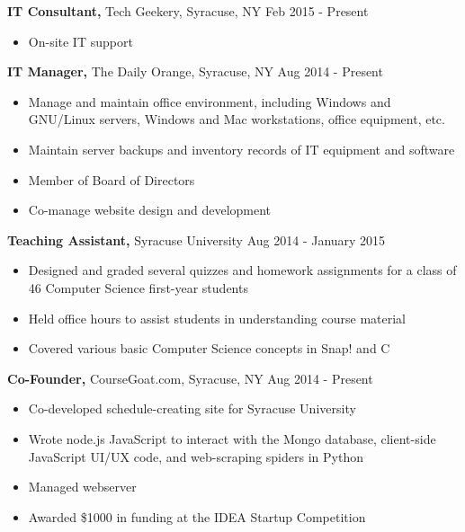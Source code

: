 \documentclass[margin]{res}
\begin{document}
\begin{resume}
 {\bf IT Consultant,} Tech Geekery, Syracuse, NY \hfill  Feb 2015 - Present
\begin{itemize} \itemsep -2pt %
\item On-site IT support
\end{itemize}
 
{\bf IT Manager,} The Daily Orange, Syracuse, NY \hfill  Aug 2014 - Present
\begin{itemize} \itemsep -2pt %
\item Manage and maintain office environment, including Windows and GNU/Linux servers, Windows and Mac workstations, office equipment, etc.
\item Maintain server backups and inventory records of IT equipment and software
\item Member of Board of Directors
\item Co-manage website design and development
\end{itemize}

{\bf Teaching Assistant,} Syracuse University \hfill  Aug 2014 - January 2015
\begin{itemize} \itemsep -2pt %
\item Designed and graded several quizzes and homework assignments for a class of 46 Computer Science first-year students
\item Held office hours to assist students in understanding course material
\item Covered various basic Computer Science concepts in Snap! and C
\end{itemize}

{\bf Co-Founder,} CourseGoat.com, Syracuse, NY \hfill
Aug 2014 - Present            
\begin{itemize} \itemsep -2pt
\item  Co-developed schedule-creating site for Syracuse University
\item Wrote node.js JavaScript to interact with the Mongo database, client-side JavaScript UI/UX code, and web-scraping spiders in Python
\item Managed webserver
\item Awarded \$1000 in funding at the IDEA Startup Competition
\end{itemize}




 



\end{resume}
\end{document}
